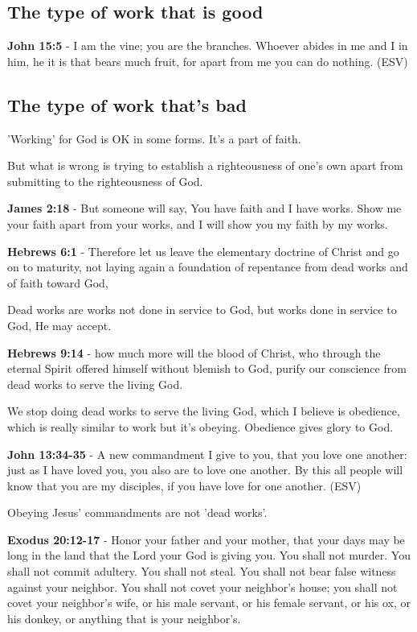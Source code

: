 \documentclass[11pt]{article}
\begin{document}
\subsection{The type of work that is good}
\label{sec:org6220a7a}
\textbf{John 15:5} -  I am the vine; you are the branches.  Whoever abides in me and I in him, he it is that bears much fruit, for apart from me you can do nothing.  (ESV)

\subsection{The type of work that's bad}
\label{sec:orgb57ff11}
'Working' for God is OK in some forms. It's a part of faith.

But what is wrong is trying to establish a righteousness of one's own apart from submitting to the righteousness of God.

\textbf{James 2:18} - But someone will say, You have faith and I have works. Show me your faith apart from your works, and I will show you my faith by my works.

\textbf{Hebrews 6:1} - Therefore let us leave the elementary doctrine of Christ and go on to maturity, not laying again a foundation of repentance from dead works and of faith toward God,

Dead works are works not done in service to God, but works done in service to God, He may accept.

\textbf{Hebrews 9:14} - how much more will the blood of Christ, who through the eternal Spirit offered himself without blemish to God, purify our conscience from dead works to serve the living God.

We stop doing dead works to serve the living God, which I believe is obedience,
which is really similar to work but it's obeying. Obedience gives glory to God.

\textbf{John 13:34-35} - A new commandment I give to you, that you love one another: just as I have loved you, you also are to love one another. By this all people will know that you are my disciples, if you have love for one another. (ESV)

Obeying Jesus' commandments are not 'dead works'.

\textbf{Exodus 20:12-17} - Honor your father and your mother, that your days may be long in the land that the Lord your God is giving you.  You shall not murder.  You shall not commit adultery.  You shall not steal.  You shall not bear false witness against your neighbor.  You shall not covet your neighbor's house; you shall not covet your neighbor's wife, or his male servant, or his female servant, or his ox, or his donkey, or anything that is your neighbor's.
\end{document}
